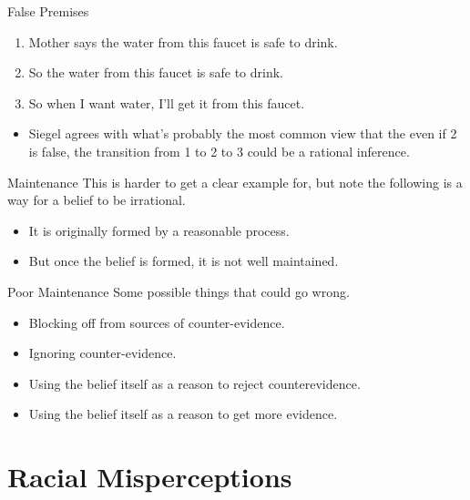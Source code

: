 \documentclass[
  17pt,
  letterpaper,
  ignorenonframetext,
  aspectratio=169,
  xcolor={dvipsnames}]{beamer}
\providecommand{\tightlist}{%
  \setlength{\itemsep}{0pt}\setlength{\parskip}{0pt}}\usepackage{longtable,booktabs,array}
\begin{document}
\begin{frame}{False Premises}
\protect\hypertarget{false-premises}{}
\begin{enumerate}[<+->]
\tightlist
\item
  Mother says the water from this faucet is safe to drink.
\item
  So the water from this faucet is safe to drink.
\item
  So when I want water, I'll get it from this faucet.
\end{enumerate}

\begin{itemize}[<+->]
\tightlist
\item
  Siegel agrees with what's probably the most common view that the even
  if 2 is false, the transition from 1 to 2 to 3 could be a rational
  inference.
\end{itemize}
\end{frame}

\begin{frame}{Maintenance}
\protect\hypertarget{maintenance}{}
This is harder to get a clear example for, but note the following is a
way for a belief to be irrational.

\begin{itemize}[<+->]
\tightlist
\item
  It is originally formed by a reasonable process.
\item
  But once the belief is formed, it is not well maintained.
\end{itemize}
\end{frame}

\begin{frame}{Poor Maintenance}
\protect\hypertarget{poor-maintenance}{}
Some possible things that could go wrong.

\begin{itemize}[<+->]
\tightlist
\item
  Blocking off from sources of counter-evidence.
\item
  Ignoring counter-evidence.
\item
  Using the belief itself as a reason to reject counterevidence.
\item
  Using the belief itself as a reason to get more evidence.
\end{itemize}
\end{frame}

\hypertarget{racial-misperceptions}{%
\section{Racial Misperceptions}\label{racial-misperceptions}}
\end{document}
